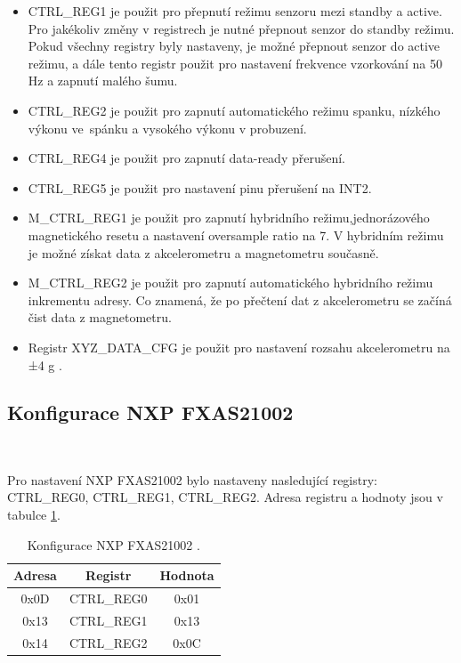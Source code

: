 \begin{itemize}
    \item CTRL\_REG1 je použit pro přepnutí režimu senzoru mezi standby a active.
    Pro jakékoliv změny v registrech je nutné přepnout senzor do standby režimu.
    Pokud všechny registry byly nastaveny, je možné přepnout senzor do active
    režimu, a dále tento registr použit pro nastavení frekvence vzorkování na 50 Hz
    a zapnutí malého šumu.

    \item CTRL\_REG2 je použit pro zapnutí automatického režimu spanku, nízkého
    výkonu ve~spánku a vysokého výkonu v probuzení.

    \item CTRL\_REG4 je použit pro zapnutí data-ready přerušení.

    \item CTRL\_REG5 je použit pro nastavení pinu přerušení na INT2.

    \item M\_CTRL\_REG1 je použit pro zapnutí hybridního režimu,jednorázového
    magnetického resetu a nastavení oversample ratio na 7. V hybridním režimu je
    možné získat data z akcelerometru a magnetometru současně.

    \item M\_CTRL\_REG2 je použit pro zapnutí automatického hybridního režimu
    inkrementu adresy. Co znamená, že po přečtení dat z akcelerometru se začíná čist
    data z magnetometru.

    \item Registr XYZ\_DATA\_CFG je použit pro nastavení rozsahu akcelerometru na ±4
    g \cite{FXOS8700CQ}.
\end{itemize}

\subsection{Konfigurace NXP FXAS21002}\

Pro nastavení NXP FXAS21002 bylo nastaveny nasledující registry: CTRL\_REG0,
CTRL\_REG1, CTRL\_REG2. Adresa registru a hodnoty jsou v tabulce
\ref{tab:FXAS21002}.

\begin{table}[!h]
    \centering
    \begin{tabular}{ccc}
        \hline
        \textbf{Adresa} & \textbf{Registr} & \textbf{Hodnota} \\
        \hline
        0x0D            & CTRL\_REG0       & 0x01             \\
        0x13            & CTRL\_REG1       & 0x13             \\
        0x14            & CTRL\_REG2       & 0x0C             \\
        \hline
    \end{tabular}
    \caption{Konfigurace NXP FXAS21002 \cite{FXAS21002}.}
    \label{tab:FXAS21002}
\end{table}

